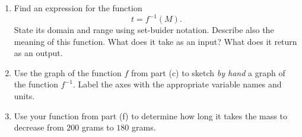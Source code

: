 \documentclass{ximera}
\begin{document}
\begin{question}
\begin{enumerate}
\item Find an expression for the function 
\[ 
      t  = f^{-1}(M) .
\]
State its domain and range using set-buider notation. Describe also the meaning of this function. What does it take as an input? What does it return as an output.

\item Use the graph of the function $f$ from part (c) to sketch \emph{by hand} a graph of the function $f^{-1}$. Label the axes with the appropriate variable names and units.

\item Use your function from part (f) to determine how long it takes the mass to decrease from $200$ grams to $180$ grams.

\end{enumerate}
\end{question}
\end{document}
